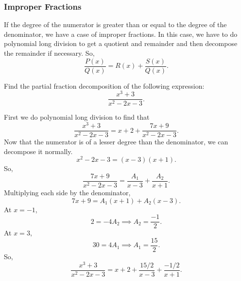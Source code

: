 \subsubsection{Improper Fractions}
\noindent
If the degree of the numerator is greater than or equal to the degree of the denominator, we have a case of improper fractions.
In this case, we have to do polynomial long division to get a quotient and remainder and then decompose the remainder if necessary.
So,
\begin{equation*}
	\frac{P(x)}{Q(x)} = R(x) + \frac{S(x)}{Q(x)}.
\end{equation*}

\begin{example}
	Find the partial fraction decomposition of the following expression:
	\begin{equation*}
		\frac{x^3+3}{x^2-2x-3}.
	\end{equation*}
\end{example}
\begin{answer}
	First we do polynomial long division to find that
	\begin{equation*}
		\frac{x^3+3}{x^2-2x-3} = x + 2 + \frac{7x+9}{x^2-2x-3}.
	\end{equation*}
	Now that the numerator is of a lesser degree than the denominator, we can decompose it normally.
	\begin{equation*}
		x^2-2x-3 = (x-3)(x+1).
	\end{equation*}
	So,
	\begin{equation*}
		\frac{7x+9}{x^2-2x-3} = \frac{A_1}{x-3} + \frac{A_2}{x+1}.
	\end{equation*}
	Multiplying each side by the denominator,
	\begin{equation*}
		7x+9 = A_1(x+1) + A_2(x-3).
	\end{equation*}
	At $x=-1$,
	\begin{equation*}
		2 = -4A_2 \implies A_2 = \frac{-1}{2}.
	\end{equation*}
	At $x=3$,
	\begin{equation*}
		30 = 4A_1 \implies A_1 = \frac{15}{2}.
	\end{equation*}
	So,
	\begin{equation*}
		\frac{x^3+3}{x^2-2x-3} = x + 2 + \frac{15/2}{x-3} + \frac{-1/2}{x+1}.
	\end{equation*}
\end{answer}